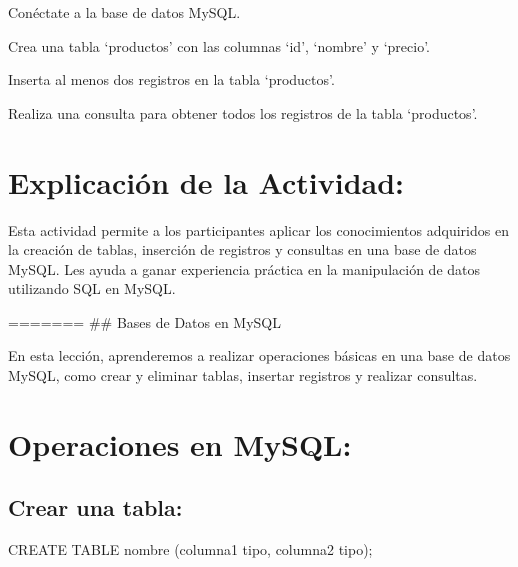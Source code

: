 \documentclass[
  a4paper,
  DIV=11,
  numbers=noendperiod,
  onepage,
  openany]{scrreprt}
\newenvironment{Shaded}{\begin{snugshade}}{\end{snugshade}}
\newcommand{\KeywordTok}[1]{\textcolor[rgb]{0.00,0.23,0.31}{#1}}
\newcommand{\NormalTok}[1]{\textcolor[rgb]{0.00,0.23,0.31}{#1}}
\begin{document}
\begin{tcolorbox}[enhanced jigsaw, colbacktitle=quarto-callout-important-color!10!white, toprule=.15mm, leftrule=.75mm, titlerule=0mm, opacityback=0, rightrule=.15mm, opacitybacktitle=0.6, breakable, left=2mm, coltitle=black, title=\textcolor{quarto-callout-important-color}{\faExclamation}\hspace{0.5em}{Actividad Práctica:}, toptitle=1mm, bottomtitle=1mm, arc=.35mm, bottomrule=.15mm, colback=white, colframe=quarto-callout-important-color-frame]

Conéctate a la base de datos MySQL.

Crea una tabla `productos' con las columnas `id', `nombre' y `precio'.

Inserta al menos dos registros en la tabla `productos'.

Realiza una consulta para obtener todos los registros de la tabla
`productos'.

\end{tcolorbox}

\hypertarget{explicaciuxf3n-de-la-actividad-72}{%
\section{Explicación de la
Actividad:}\label{explicaciuxf3n-de-la-actividad-72}}

Esta actividad permite a los participantes aplicar los conocimientos
adquiridos en la creación de tablas, inserción de registros y consultas
en una base de datos MySQL. Les ayuda a ganar experiencia práctica en la
manipulación de datos utilizando SQL en MySQL.

======= \#\# Bases de Datos en MySQL

En esta lección, aprenderemos a realizar operaciones básicas en una base
de datos MySQL, como crear y eliminar tablas, insertar registros y
realizar consultas.

\hypertarget{operaciones-en-mysql-1}{%
\section{Operaciones en MySQL:}\label{operaciones-en-mysql-1}}

\hypertarget{crear-una-tabla-3}{%
\subsection{Crear una tabla:}\label{crear-una-tabla-3}}

\begin{Shaded}
\begin{Highlighting}[]
\KeywordTok{CREATE} \KeywordTok{TABLE}\NormalTok{ nombre (columna1 tipo, columna2 tipo);}
\end{Highlighting}
\end{Shaded}
\end{document}

